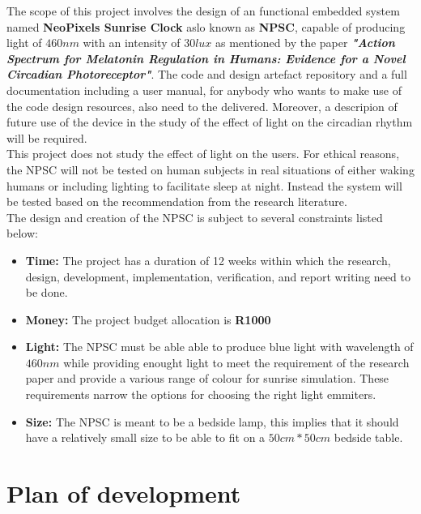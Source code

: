 The scope of this project involves the design of an functional embedded system named \textbf{NeoPixels Sunrise Clock} aslo known as \textbf{NPSC}, capable of producing light of $460nm$ with an intensity of $30 lux$ as mentioned by the paper \textit{\textbf{"Action Spectrum for Melatonin Regulation in Humans: Evidence for a Novel Circadian Photoreceptor"}}. The code and design artefact repository and a full documentation including a user manual, for anybody who wants to make use of the code design resources, also need to the delivered. Moreover, a descripion of future use of the device in the study of the effect of light on the circadian rhythm will be required.\\
This project does not study the effect of light on the users. For ethical reasons, the NPSC will not be tested  on human subjects in real situations of either waking humans or including lighting to facilitate sleep at night. Instead the system will be tested based on the recommendation from the research  literature.\\
The design and creation of the NPSC is subject to several constraints listed below:
\begin{itemize}
\item \textbf{Time:} The project has a duration of 12 weeks within which the research, design, development, implementation, verification, and report writing need to be done.
\item \textbf{Money:} The project budget allocation is \textbf{R1000}
\item \textbf{Light:} The NPSC must be able able to produce blue light with wavelength of $460nm$ while providing enought light to meet the requirement of the research paper and provide a various range of colour for sunrise simulation. These requirements narrow the options for choosing the right light emmiters.
\item \textbf{Size:} The NPSC is meant to be a bedside lamp, this implies that it should have a relatively small size to be able to fit on a $50cm*50cm$ bedside table.
\end{itemize}


\section{Plan of development}

